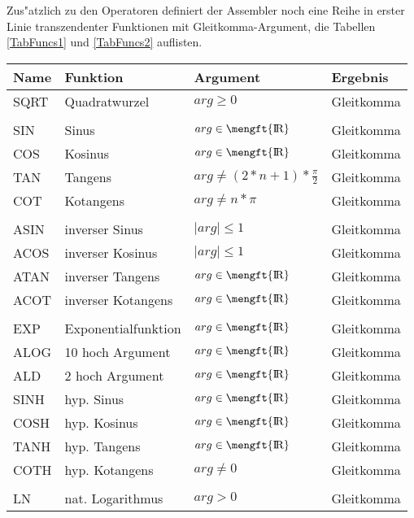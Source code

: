 \documentclass[12pt,a4paper,twoside]{report}
\def \rz{\hbox{\mengft{I \hskip -1.7mm R}}}
\begin{document}
Zus"atzlich zu den Operatoren definiert der Assembler noch eine Reihe
in erster Linie transzendenter Funktionen mit Gleitkomma-Argument, die
Tabellen \ref{TabFuncs1} und \ref{TabFuncs2} auflisten.
\begin{table*}[htbp]
\begin{center}\begin{tabular}{|l|l|l|l|}
\hline
Name     & Funktion             & Argument & Ergebnis \\
\hline
\hline
SQRT     & Quadratwurzel        & $arg \geq 0$ & Gleitkomma \\
         &                      & & \\
SIN      & Sinus                & $arg \in \rz$ & Gleitkomma \\
COS      & Kosinus              & $arg \in \rz$ & Gleitkomma \\
TAN      & Tangens              & $arg \neq (2*n+1)*\frac{\pi}{2}$ & Gleitkomma \\
COT      & Kotangens            & $arg \neq n*\pi$ & Gleitkomma \\
         &                      & & \\
ASIN     & inverser Sinus       & $\mid arg \mid \leq 1$ & Gleitkomma \\
ACOS     & inverser Kosinus     & $\mid arg \mid \leq 1$ & Gleitkomma \\
ATAN     & inverser Tangens     & $arg \in \rz$ & Gleitkomma \\
ACOT     & inverser Kotangens   & $arg \in \rz$ & Gleitkomma \\
         &                      & & \\
EXP      & Exponentialfunktion  & $arg \in \rz$ & Gleitkomma \\
ALOG     & 10 hoch Argument     & $arg \in \rz$ & Gleitkomma \\
ALD      & 2 hoch Argument      & $arg \in \rz$ & Gleitkomma \\
SINH     & hyp. Sinus           & $arg \in \rz$ & Gleitkomma \\
COSH     & hyp. Kosinus         & $arg \in \rz$ & Gleitkomma \\
TANH     & hyp. Tangens         & $arg \in \rz$ & Gleitkomma \\
COTH     & hyp. Kotangens       & $arg \neq 0$ & Gleitkomma \\
         &                      & & \\
LN       & nat. Logarithmus     & $arg > 0$ & Gleitkomma \\

\end{tabular}
\end{center}
\end{table*}
\end{document}
